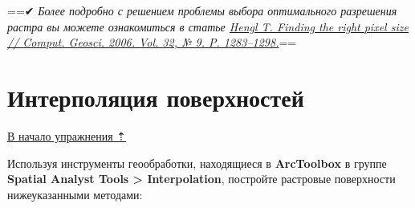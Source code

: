 \documentclass[]{book}
\theoremstyle{definition}
\theoremstyle{definition}
\theoremstyle{definition}
\theoremstyle{remark}
\begin{document}
==✔︎ \emph{Более подробно с решением проблемы выбора оптимального
разрешения растра вы можете ознакомиться в статье
\href{https://www.researchgate.net/publication/222014409_Finding_the_right_pixel_size}{Hengl
T. Finding the right pixel size // Comput. Geosci. 2006. Vol. 32, № 9.
P. 1283--1298.}}==

\hypertarget{interpolation-surfaces}{%
\section{Интерполяция поверхностей}\label{interpolation-surfaces}}

\protect\hyperlink{interpolation}{В начало упражнения ⇡}

Используя инструменты геообработки, находящиеся в \textbf{ArcToolbox} в
группе \textbf{Spatial Analyst Tools \textgreater{} Interpolation},
постройте растровые поверхности нижеуказанными методами:
\end{document}
